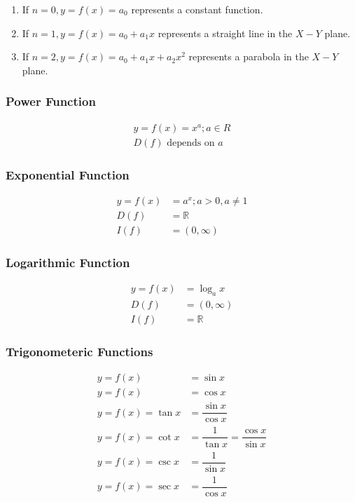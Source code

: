 \documentclass[fleqn]{article}
\begin{document}
\begin{enumerate}
	\item	If $n = 0, y = f(x) = a_0$ represents a constant function.
	\item	If $n = 1, y = f(x) = a_0 + a_1 x$ represents a straight line in the $X-Y$ plane.
	\item	If $n = 2, y = f(x) = a_0 + a_1 x + a_2 x^2$ represents a parabola in the $X-Y$ plane.
\end{enumerate}

\subsubsection{Power Function}

\begin{align}
	y = f(x) = x^a ; a\in R \label{power function} \\
	D(f) \text{ depends on } a \label{domain of power function}
\end{align}

\subsubsection{Exponential Function}

\begin{align}
	y = f(x) &= a^x ; a > 0, a \neq 1 \label{exponential function} \\
	D(f) &= \mathbb{R} \label{domain of exponential function} \\
	I(f) &= (0, \infty) \label{image of exponential function}
\end{align}

\subsubsection{Logarithmic Function}

\begin{align}
	y = f(x) &= \log_{a} {x} \label{logarithmic function} \\
	D(f) &= (0,\infty) \label{domain of logarithmic function} \\
	I(f) &= \mathbb{R} \label{image of logarithmic function}
\end{align}

\subsubsection{Trigonometeric Functions}

\begin{align}
	y = f(x) &= \sin x \\
	y = f(x) &= \cos x \\
	y = f(x) = \tan x &= \dfrac{\sin x}{\cos x} \\
	y = f(x)  = \cot x &= \dfrac{1}{\tan x} = \dfrac{\cos x}{\sin x} \\
	y = f(x) = \csc x &= \dfrac{1}{\sin x} \\
	y = f(x) = \sec x &= \dfrac{1}{\cos x} 
\end{align}
\end{document}
